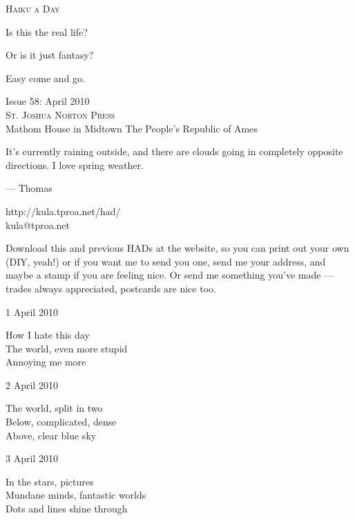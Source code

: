 \documentclass[12pt]{article}
\begin{document}
\begin{center}
{\fontsize{36}{48}\selectfont \textsc{Haiku a Day }}
\end{center}

\vspace*{3.5cm}

{\fontsize{26}{52}\selectfont 

Is this the real life?

Or is it just fantasy?

Easy come and go. 

}

\vspace*{5.0cm}
\begin{center}
{\large{Issue 58: April 2010}} \\[5mm]
{\fontsize{8}{8}\selectfont  \textsc{ St. Joshua Norton Press }} \\[1mm]
{\fontsize{6}{6}\selectfont Mathom House in Midtown \textbar The People's Republic of Ames }
\end{center}


\newpage

It's currently raining outside, and there are clouds going in 
completely opposite directions. I love spring weather.

--- Thomas

http://kula.tproa.net/had/ \\
kula@tproa.net

Download this and previous HADs at the website, so you can
print out your own (DIY, yeah!) or if you want me to send
you one, send me your address, and maybe a stamp if you
are feeling nice. Or send me something you've made ---
trades always appreciated, postcards are nice too.

\vspace*{4.5cm}

1 April 2010

How I hate this day \\
The world, even more stupid \\
Annoying me more

2 April 2010

The world, split in two \\
Below, complicated, dense \\
Above, clear blue sky

\newpage

3 April 2010

In the stars, pictures \\
Mundane minds, fantastic worlds \\
Dots and lines shine through
\end{document}
